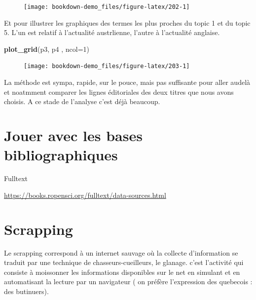\documentclass[
]{book}
\newenvironment{Shaded}{\begin{snugshade}}{\end{snugshade}}
\newcommand{\DataTypeTok}[1]{\textcolor[rgb]{0.13,0.29,0.53}{#1}}
\newcommand{\DecValTok}[1]{\textcolor[rgb]{0.00,0.00,0.81}{#1}}
\newcommand{\KeywordTok}[1]{\textcolor[rgb]{0.13,0.29,0.53}{\textbf{#1}}}
\newcommand{\NormalTok}[1]{#1}
\begin{document}
\begin{figure}

{\centering \texttt{[image: bookdown-demo\_files/figure-latex/202-1]} 

}

\end{figure}

Et pour illustrer les graphiques des termes les plus proches du topic 1 et du topic 5. L'un est relatif à l'actualité austrlienne, l'autre à l'actualité anglaise.

\begin{Shaded}
\begin{Highlighting}[]
\KeywordTok{plot_grid}\NormalTok{(p3, p4 , }\DataTypeTok{ncol=}\DecValTok{1}\NormalTok{)}
\end{Highlighting}
\end{Shaded}

\begin{figure}

{\centering \texttt{[image: bookdown-demo\_files/figure-latex/203-1]} 

}

\end{figure}

La méthode est sympa, rapide, sur le pouce, mais pas suffisante pour aller audelà et noatmment comparer les lignes éditoriales des deux titres que nous avons choisis. A ce stade de l'analyse c'est déjà beaucoup.

\hypertarget{jouer-avec-les-bases-bibliographiques}{%
\section{Jouer avec les bases bibliographiques}\label{jouer-avec-les-bases-bibliographiques}}

Fulltext

\url{https://books.ropensci.org/fulltext/data-sources.html}

\hypertarget{scrapping}{%
\section{Scrapping}\label{scrapping}}

Le scrapping correspond à un internet sauvage où la collecte d'information se traduit par une technique de chasseurs-cueilleurs, le glanage. c'est l'activité qui consiste à moissonner les informations disponibles sur le net en simulant et en automatisant la lecture par un navigateur ( on préfère l'expression des quebecois : des butinuers).
\end{document}
